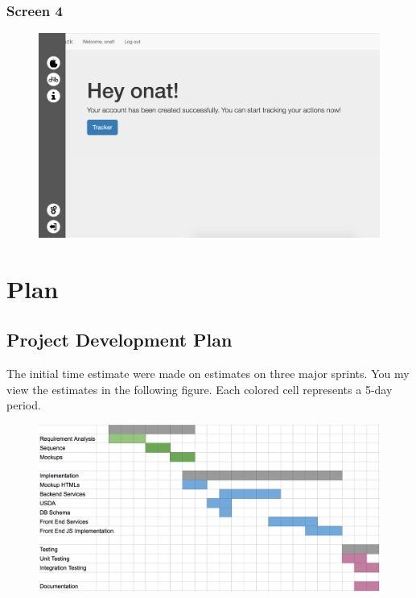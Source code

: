 \subsubsection{Screen 4}
\begin{figure}[H]
\centering
\includegraphics[scale=0.38]{5}
\end{figure}


\section{Plan}
\subsection{Project Development Plan}

The initial time estimate were made on estimates on three major sprints.
You my view the estimates in the following figure. Each colored cell represents a 5-day period.

\begin{figure}[H]
\centering
\includegraphics[scale=0.38]{projectplan}
\end{figure}
